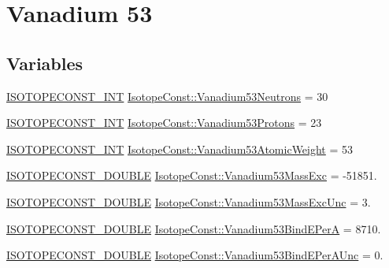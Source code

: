 \hypertarget{group___isotope_const-_vanadium-_v53}{}\section{Vanadium 53}
\label{group___isotope_const-_vanadium-_v53}
\subsection*{Variables}
\begin{DoxyCompactItemize}
\item 
\mbox{\hyperlink{group___isotope_const-_macros_ga5f18360b3e99483a35c32d789e62621c}{I\+S\+O\+T\+O\+P\+E\+C\+O\+N\+S\+T\+\_\+\+I\+NT}} \mbox{\hyperlink{group___isotope_const-_vanadium-_v53_ga5643618a0936c2210dea1f535ee0b424}{Isotope\+Const\+::\+Vanadium53\+Neutrons}} = 30
\item 
\mbox{\hyperlink{group___isotope_const-_macros_ga5f18360b3e99483a35c32d789e62621c}{I\+S\+O\+T\+O\+P\+E\+C\+O\+N\+S\+T\+\_\+\+I\+NT}} \mbox{\hyperlink{group___isotope_const-_vanadium-_v53_ga5374d98ff29eb3145285dd4d61c99e6d}{Isotope\+Const\+::\+Vanadium53\+Protons}} = 23
\item 
\mbox{\hyperlink{group___isotope_const-_macros_ga5f18360b3e99483a35c32d789e62621c}{I\+S\+O\+T\+O\+P\+E\+C\+O\+N\+S\+T\+\_\+\+I\+NT}} \mbox{\hyperlink{group___isotope_const-_vanadium-_v53_gaeb0dd059f560c6510f5a39b634b95315}{Isotope\+Const\+::\+Vanadium53\+Atomic\+Weight}} = 53
\item 
\mbox{\hyperlink{group___isotope_const-_macros_ga8f45a7272ce02c0b4c65c44636ed719a}{I\+S\+O\+T\+O\+P\+E\+C\+O\+N\+S\+T\+\_\+\+D\+O\+U\+B\+LE}} \mbox{\hyperlink{group___isotope_const-_vanadium-_v53_ga3344c6c120ed38779a9da5a24cb7e78a}{Isotope\+Const\+::\+Vanadium53\+Mass\+Exc}} = -\/51851.
\item 
\mbox{\hyperlink{group___isotope_const-_macros_ga8f45a7272ce02c0b4c65c44636ed719a}{I\+S\+O\+T\+O\+P\+E\+C\+O\+N\+S\+T\+\_\+\+D\+O\+U\+B\+LE}} \mbox{\hyperlink{group___isotope_const-_vanadium-_v53_ga06e27a32590356190639e00a44cbcedb}{Isotope\+Const\+::\+Vanadium53\+Mass\+Exc\+Unc}} = 3.
\item 
\mbox{\hyperlink{group___isotope_const-_macros_ga8f45a7272ce02c0b4c65c44636ed719a}{I\+S\+O\+T\+O\+P\+E\+C\+O\+N\+S\+T\+\_\+\+D\+O\+U\+B\+LE}} \mbox{\hyperlink{group___isotope_const-_vanadium-_v53_ga493090b511727dd48a75ab5c704f4fd1}{Isotope\+Const\+::\+Vanadium53\+Bind\+E\+PerA}} = 8710.
\item 
\mbox{\hyperlink{group___isotope_const-_macros_ga8f45a7272ce02c0b4c65c44636ed719a}{I\+S\+O\+T\+O\+P\+E\+C\+O\+N\+S\+T\+\_\+\+D\+O\+U\+B\+LE}} \mbox{\hyperlink{group___isotope_const-_vanadium-_v53_ga26398936c7ef82bdf0c793f28cfb200b}{Isotope\+Const\+::\+Vanadium53\+Bind\+E\+Per\+A\+Unc}} = 0.

\end{DoxyCompactItemize}
